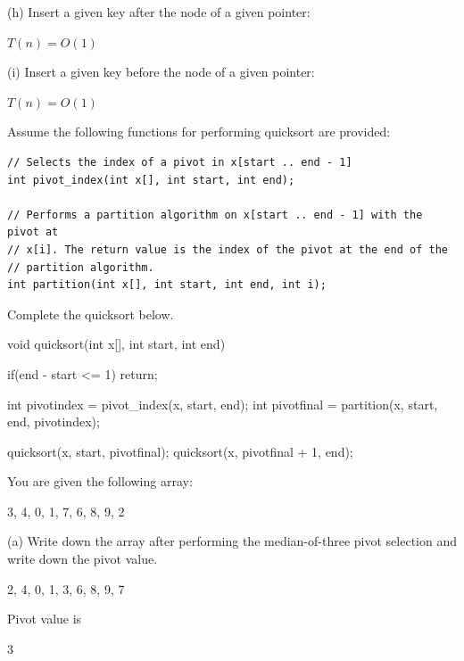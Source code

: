 (h)
Insert a given key after the node of a given pointer:
\\
\ANSWER
\begin{answerlong}
$T(n) = O(1)$
\end{answerlong}

(i)
Insert a given key before the node of a given pointer:
\\
\ANSWER
\begin{answerlong}
$T(n) = O(1)$
\end{answerlong}

\newpage
\nextq %
Assume the following functions for performing quicksort are
provided:
\vspace{-2mm}
\begin{Verbatim}[frame=single,fontsize=\small]
// Selects the index of a pivot in x[start .. end - 1]
int pivot_index(int x[], int start, int end);
 
// Performs a partition algorithm on x[start .. end - 1] with the pivot at
// x[i]. The return value is the index of the pivot at the end of the
// partition algorithm. 
int partition(int x[], int start, int end, int i);
\end{Verbatim}
\vspace{-4mm}
Complete the quicksort below.

\ANSWER
\begin{answercode}
void quicksort(int x[], int start, int end)
{ 
    if(end - start <= 1)
      return;
      
    int pivotindex = pivot_index(x, start, end);
    int pivotfinal = partition(x, start, end, pivotindex);

    quicksort(x, start, pivotfinal);
    quicksort(x, pivotfinal + 1, end);
}
\end{answercode}

\newpage
\nextq %
You are given the following array:
\begin{console}
{3, 4, 0, 1, 7, 6, 8, 9, 2}
\end{console}

(a)
Write down the array after performing the median-of-three
pivot selection and write down the pivot value.
\\
\ANSWER
\begin{answercode}
{2, 4, 0, 1, 3, 6, 8, 9, 7}
\end{answercode}
Pivot value is
\begin{answercode}
3
\end{answercode}


